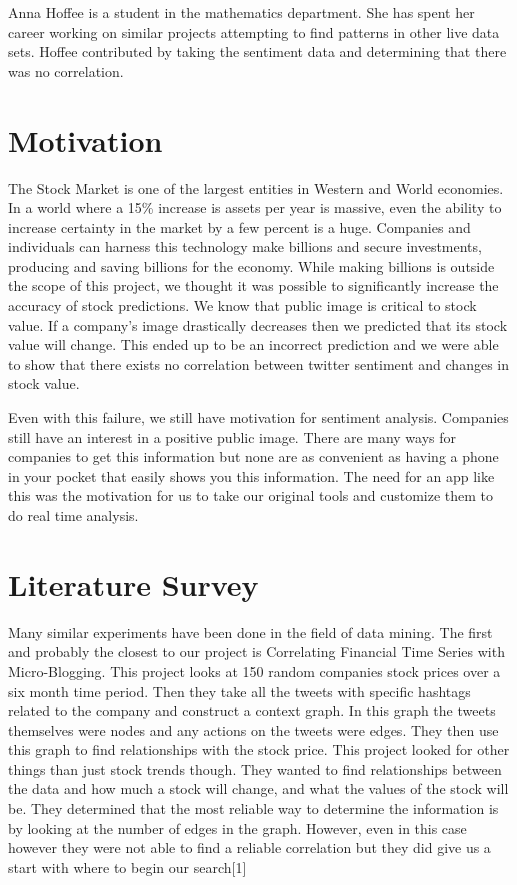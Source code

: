 \documentclass{acm_proc_article-sp}
\begin{document}
Anna Hoffee is a student in the mathematics department. She has spent her
career working on similar projects attempting to find patterns in other live
data sets. Hoffee contributed by taking the sentiment data and determining that
there was no correlation.

\section{Motivation}

The Stock Market is one of the largest entities in Western and World economies.
In a world where a 15\% increase is assets per year is massive,  even the
ability to increase certainty in the market by a few percent is a huge.
Companies and individuals can harness this technology make billions and secure
investments, producing and saving billions for the economy. While making
billions is outside the scope of this project, we thought it was possible to
significantly increase the accuracy of stock predictions. We know that public
image is critical to stock value. If a company's image drastically decreases
then we predicted that its stock value will change. This ended up to be an
incorrect prediction and we were able to show that there exists no correlation
between twitter sentiment and changes in stock value.

Even with this failure, we still have motivation for sentiment analysis.
Companies still have an interest in a positive public image. There are many
ways for companies to get this information but none are as convenient as having
a phone in your pocket that easily shows you this information. The need for an
app like this was the motivation for us to take our original tools and
customize them to do real time analysis. 

\section{Literature Survey}

Many similar experiments have been done in the field of data mining. The first
and probably the closest to our project is Correlating Financial Time Series
with Micro-Blogging. This project looks at 150 random companies stock prices
over a six month time period. Then they take all the tweets with specific
hashtags related to the company and construct a context graph. In this graph
the tweets themselves were nodes and any actions on the tweets were edges. They
then use this graph to find relationships with the stock price. This project
looked for other things than just stock trends though. They wanted to find
relationships between the data and how much a stock will change, and what the
values of the stock will be. They determined that the most reliable way to
determine the information is by looking at the number of edges in the graph.
However, even in this case however they were not able to find a reliable
correlation but they did give us a start with where to begin our search[1] 
\end{document}
